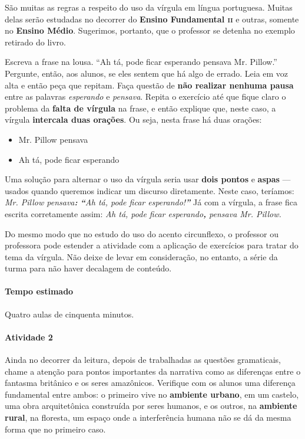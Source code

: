 \documentclass[11pt]{extarticle}
\begin{document}
São muitas as regras a respeito do uso da  vírgula em língua portuguesa. 
Muitas delas serão estudadas no decorrer do \textbf{Ensino Fundamental \textsc{ii}} e outras,
somente no \textbf{Ensino Médio}. 
Sugerimos, portanto, que o professor se detenha no exemplo retirado do livro. 

Escreva a frase na lousa. ``Ah tá, pode ficar esperando pensava Mr. Pillow.''
Pergunte, então, aos alunos, se eles sentem que há algo de errado. Leia em voz
alta e então peça que repitam. Faça questão de \textbf{não realizar nenhuma pausa}
entre as palavras \textit{esperando} e \textit{pensava}.
Repita o exercício até que fique claro o problema da \textbf{falta de vírgula} na frase,
e então explique que, neste caso, a vírgula \textbf{intercala duas orações}. 
Ou seja, nesta frase há duas orações:

\begin{itemize}
	\item Mr. Pillow pensava
	\item Ah tá, pode ficar esperando
\end{itemize}

Uma solução para alternar o uso da vírgula seria usar \textbf{dois pontos} e \textbf{aspas} ---
usados quando queremos indicar um discurso diretamente. 
Neste caso, teríamos: \textit{Mr. Pillow pensava\textbf{:} \textbf{``}Ah tá, pode ficar esperando!\textbf{''}}
Já com a vírgula, a frase fica escrita corretamente assim: \textit{Ah tá, pode ficar esperando\textbf{,}
pensava Mr. Pillow.}

Do mesmo modo que no estudo do uso do acento circunflexo, o professor ou professora pode estender
a atividade com a aplicação de exercícios para tratar do tema da vírgula.
Não deixe de levar em consideração, no entanto, a série da turma para não haver
decalagem de conteúdo. 

\paragraph{Tempo estimado} Quatro aulas de cinquenta minutos.

\paragraph{Atividade 2}

Ainda no decorrer da leitura, depois de trabalhadas as questões gramaticais, 
chame a atenção para pontos importantes da narrativa como as diferenças entre 
o fantasma britânico e os seres amazônicos. Verifique com os alunos uma diferença
fundamental entre ambos: o primeiro vive no \textbf{ambiente urbano}, em um castelo, uma 
obra arquitetônica construída por seres humanos, e os outros, na \textbf{ambiente rural},
na floresta, um espaço onde a interferência humana não se dá da mesma forma que 
no primeiro caso. 
\end{document}
